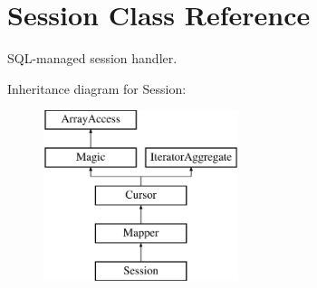 \hypertarget{class_d_b_1_1_s_q_l_1_1_session}{}\section{Session Class Reference}
\label{class_d_b_1_1_s_q_l_1_1_session}


S\+Q\+L-\/managed session handler.  


Inheritance diagram for Session\+:\begin{figure}[H]
\begin{center}
\leavevmode
\includegraphics[height=5.000000cm]{class_d_b_1_1_s_q_l_1_1_session}
\end{center}
\end{figure}
